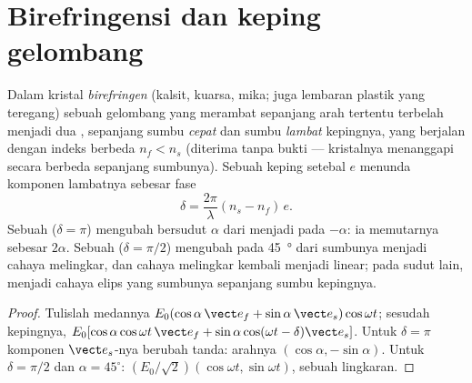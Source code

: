 \section{Birefringensi dan keping gelombang}

\begin{proposition}\label{prop:b2:plane-waves-polarization:plates}
Dalam kristal \emph{birefringen} (kalsit, kuarsa, mika; juga lembaran
plastik yang teregang) sebuah gelombang yang merambat sepanjang arah tertentu
terbelah menjadi dua , sepanjang sumbu \emph{cepat} dan
sumbu \emph{lambat} kepingnya, yang berjalan dengan indeks berbeda $n_f <
n_s$ (diterima tanpa bukti --- kristalnya menanggapi secara berbeda sepanjang sumbunya). Sebuah
keping setebal $e$ menunda komponen lambatnya sebesar fase
\[
\delta = \frac{2\pi}\lambda(n_s - n_f)\,e .
\]
Sebuah \emph{} ($\delta = \pi$) mengubah  bersudut
$\alpha$ dari  menjadi  pada $-\alpha$: ia
memutarnya sebesar $2\alpha$. Sebuah \emph{} ($\delta = \pi/2$) mengubah
 pada \qty{45}{\degree} dari sumbunya menjadi cahaya melingkar,
dan cahaya melingkar kembali menjadi linear; pada sudut lain, menjadi cahaya
elips yang sumbunya sepanjang sumbu kepingnya.
\end{proposition}

\begin{proof}
Tulislah medannya $E_0(\cos\alpha\,\vect e_f + \sin\alpha\,\vect e_s)\cos\omega t$;
sesudah kepingnya, $E_0[\cos\alpha\cos\omega t\,\vect e_f + \sin\alpha\cos(\omega t - \delta)
\vect e_s]$. Untuk $\delta = \pi$ komponen $\vect e_s$-nya berubah tanda: arahnya
$(\cos\alpha, -\sin\alpha)$. Untuk $\delta = \pi/2$ dan $\alpha = 45^\circ$: $(E_0/\sqrt2)(\cos
\omega t, \sin\omega t)$, sebuah lingkaran.
\end{proof}

